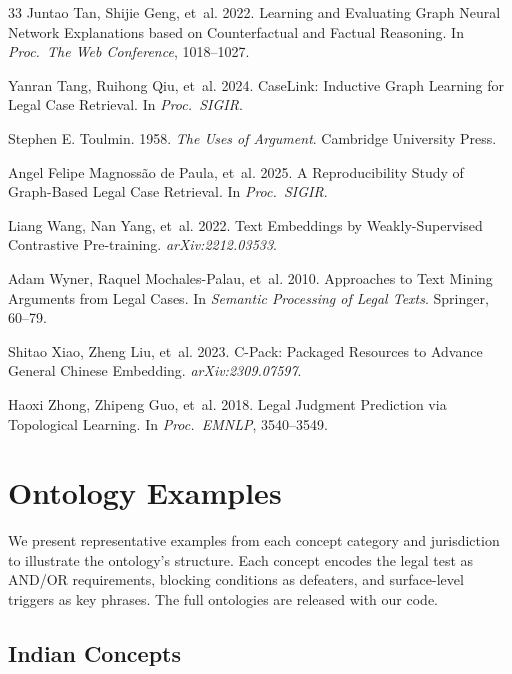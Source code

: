 \documentclass[11pt]{article}
\begin{document}
\begin{thebibliography}{33}
Juntao Tan, Shijie Geng, et~al. 2022. Learning and Evaluating Graph Neural Network Explanations based on Counterfactual and Factual Reasoning. In \emph{Proc.\ The Web Conference}, 1018--1027.

Yanran Tang, Ruihong Qiu, et~al. 2024. CaseLink: Inductive Graph Learning for Legal Case Retrieval. In \emph{Proc.\ SIGIR}.

Stephen E. Toulmin. 1958. \emph{The Uses of Argument}. Cambridge University Press.

Angel Felipe Magnoss\~{a}o de Paula, et~al. 2025. A Reproducibility Study of Graph-Based Legal Case Retrieval. In \emph{Proc.\ SIGIR}.

Liang Wang, Nan Yang, et~al. 2022. Text Embeddings by Weakly-Supervised Contrastive Pre-training. \emph{arXiv:2212.03533}.

Adam Wyner, Raquel Mochales-Palau, et~al. 2010. Approaches to Text Mining Arguments from Legal Cases. In \emph{Semantic Processing of Legal Texts}. Springer, 60--79.

Shitao Xiao, Zheng Liu, et~al. 2023. C-Pack: Packaged Resources to Advance General Chinese Embedding. \emph{arXiv:2309.07597}.

Haoxi Zhong, Zhipeng Guo, et~al. 2018. Legal Judgment Prediction via Topological Learning. In \emph{Proc.\ EMNLP}, 3540--3549.

\end{thebibliography}

\appendix

\section{Ontology Examples}
\label{app:ontology}

We present representative examples from each concept category and jurisdiction to illustrate the ontology's structure. Each concept encodes the legal test as AND/OR requirements, blocking conditions as defeaters, and surface-level triggers as key phrases. The full ontologies are released with our code.

\subsection{Indian Concepts}
\label{app:ontology:indian}
\end{document}
